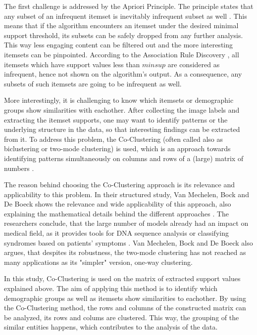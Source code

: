 The first challenge is addressed by the Apriori Principle. The principle states that any subset of an infrequent itemset is inevitably infrequent subset as well \cite{introtodatamining}. This means that if the algorithm encounters an itemset under the desired minimal support threshold, its subsets can be safely dropped from any further analysis. This way less engaging content can be filtered out and the more interesting itemsets can be pinpointed. According to the Association Rule Discovery \cite{introtodatamining}, all itemsets which have support values less than $minsup$ are considered as infrequent, hence not shown on the algorithm's output. As a consequence, any subsets of such itemsets are going to be infrequent as well. 

More interestingly, it is challenging to know which itemsets or demographic groups show similarities with eachother. After collecting the image labels and extracting the itemset supports, one may want to identify patterns or the underlying structure in the data, so that interesting findings can be extracted from it. To address this problem, the Co-Clustering (often called also as biclustering or two-mode clustering) is used, which is an approach towards identifying patterns simultaneously on columns and rows of a (large) matrix of numbers \cite{coclustering}. 

The reason behind choosing the Co-Clustering approach is its relevance and applicability to this problem. In their structured study, Van Mechelen, Bock and De Boeck shows the relevance and wide applicability of this approach, also explaining the mathematical details behind the different approaches \cite{coclustering}. The researchers conclude, that the large number of models already had an impact on medical field, as it provides tools for DNA sequence analysis or classifying syndromes based on patients' symptoms \cite{coclustering}. Van Mechelen, Bock and De Boeck also argues, that despites its robustness, the two-mode clustering has not reached as many applications as its "simpler" version, one-way clustering. 

In this study, Co-Clustering is used on the matrix of extracted support values explained above. The aim of applying this method is to identify which demographic groups as well as itemsets show similarities to eachother. By using the Co-Clustering method, the rows and columns of the constructed matrix can be analyzed, its rows and colums are clustered. This way, the grouping of the similar entities happens, which contributes to the analysis of the data.

